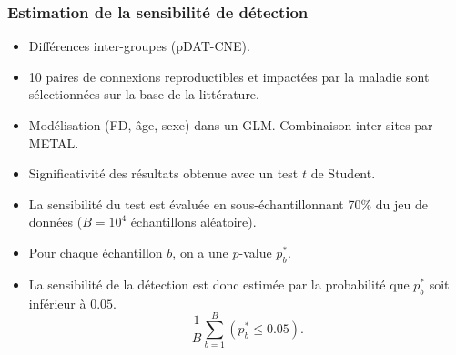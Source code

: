 \documentclass{beamer}
\begin{document}

\begin{frame}
\frametitle{Estimation de la sensibilité de détection}
\begin{itemize}
\item Différences inter-groupes (pDAT-CNE).
\item 10 paires de connexions reproductibles et impactées par la maladie sont sélectionnées sur la base de la littérature.
\item Modélisation (FD, âge, sexe) dans un GLM. Combinaison inter-sites par METAL.
\item Significativité des résultats obtenue avec un test $t$ de Student.
\item La sensibilité du test est évaluée en sous-échantillonnant 70\% du jeu de données ($B=10^4$ échantillons aléatoire).
\item Pour chaque échantillon $b$, on a une $p$-value $p^{*}_b$.
\item La sensibilité de la détection est donc estimée par la probabilité que $p^{*}_b$ soit inférieur à $0.05$.
\begin{equation}\label{Detection power}  
    \frac{1}{B}\sum\limits_{b=1}^B\left(p^{*}_b\leq0.05\right).
\end{equation}
\end{itemize}

\end{frame}
\end{document}
